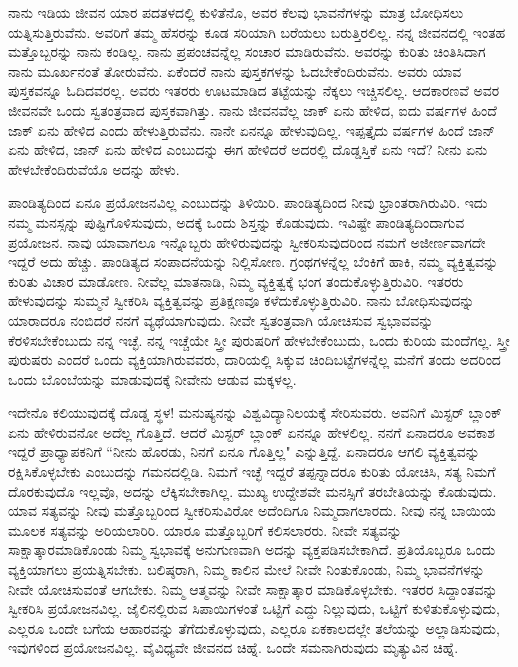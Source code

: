 ನಾನು ಇಡಿಯ ಜೀವನ ಯಾರ ಪದತಳದಲ್ಲಿ ಕುಳಿತೆನೊ, ಅವರ ಕೆಲವು ಭಾವನೆಗಳನ್ನು ಮಾತ್ರ ಬೋಧಿಸಲು ಯತ್ನಿಸುತ್ತಿರುವೆನು. ಅವರಿಗೆ ತಮ್ಮ ಹೆಸರನ್ನು ಕೂಡ ಸರಿಯಾಗಿ ಬರೆಯಲು ಬರುತ್ತಿರಲಿಲ್ಲ. ನನ್ನ ಜೀವನದಲ್ಲಿ ಇಂತಹ ಮತ್ತೊಬ್ಬರನ್ನು ನಾನು ಕಂಡಿಲ್ಲ. ನಾನು ಪ್ರಪಂಚವನ್ನೆಲ್ಲ ಸಂಚಾರ ಮಾಡಿರುವೆನು. ಅವರನ್ನು ಕುರಿತು ಚಿಂತಿಸಿದಾಗ ನಾನು ಮೂರ್ಖನಂತೆ ತೋರುವೆನು. ಏಕೆಂದರೆ ನಾನು ಪುಸ್ತಕಗಳನ್ನು ಓದಬೇಕೆಂದಿರುವೆನು. ಅವರು ಯಾವ ಪುಸ್ತಕವನ್ನೂ ಓದಿದವರಲ್ಲ. ಅವರು ಇತರರು ಊಟಮಾಡಿದ ತಟ್ಟೆಯನ್ನು ನೆಕ್ಕಲು ಇಚ್ಚಿಸಲಿಲ್ಲ. ಆದಕಾರಣವೆ ಅವರ ಜೀವನವೇ ಒಂದು ಸ್ವತಂತ್ರವಾದ ಪುಸ್ತಕವಾಗಿತ್ತು. ನಾನು ಜೀವನವೆಲ್ಲ ಜಾಕ್ ಏನು ಹೇಳಿದ, ಐದು ವರ್ಷಗಳ ಹಿಂದೆ ಜಾಕ್ ಏನು ಹೇಳಿದ ಎಂದು ಹೇಳುತ್ತಿರುವೆನು. ನಾನೇ ಏನನ್ನೂ ಹೇಳುವುದಿಲ್ಲ. ಇಪ್ಪತ್ತೈದು ವರ್ಷಗಳ ಹಿಂದೆ ಜಾನ್ ಏನು ಹೇಳಿದ, ಜಾನ್ ಏನು ಹೇಳಿದ ಎಂಬುದನ್ನು ಈಗ ಹೇಳಿದರೆ ಅದರಲ್ಲಿ ದೊಡ್ಡಸ್ತಿಕೆ ಏನು ಇದೆ? ನೀನು ಏನು ಹೇಳಬೇಕೆಂದಿರುವೆಯೊ ಅದನ್ನು ಹೇಳು.

ಪಾಂಡಿತ್ಯದಿಂದ ಏನೂ ಪ್ರಯೋಜನವಿಲ್ಲ ಎಂಬುದನ್ನು ತಿಳಿಯಿರಿ. ಪಾಂಡಿತ್ಯದಿಂದ ನೀವು ಭ್ರಾಂತರಾಗಿರುವಿರಿ. ಇದು ನಮ್ಮ ಮನಸ್ಸನ್ನು ಪುಷ್ಟಿಗೊಳಿಸುವುದು, ಅದಕ್ಕೆ ಒಂದು ಶಿಸ್ತನ್ನು ಕೊಡುವುದು. ಇವಿಷ್ಟೇ ಪಾಂಡಿತ್ಯದಿಂದಾಗುವ ಪ್ರಯೋಜನ. ನಾವು ಯಾವಾಗಲೂ ಇನ್ನೊಬ್ಬರು ಹೇಳಿರುವುದನ್ನು ಸ್ವೀಕರಿಸುವುದರಿಂದ ನಮಗೆ ಅಜೀರ್ಣವಾಗದೇ ಇದ್ದರೆ ಅದು ಹೆಚ್ಚು. ಪಾಂಡಿತ್ಯದ ಸಂಪಾದನೆಯನ್ನು ನಿಲ್ಲಿಸೋಣ. ಗ್ರಂಥಗಳನ್ನೆಲ್ಲ ಬೆಂಕಿಗೆ ಹಾಕಿ, ನಮ್ಮ ವ್ಯಕ್ತಿತ್ವವನ್ನು ಕುರಿತು ವಿಚಾರ ಮಾಡೋಣ. ನೀವೆಲ್ಲ ಮಾತನಾಡಿ, ನಿಮ್ಮ ವ್ಯಕ್ತಿತ್ವಕ್ಕೆ ಭಂಗ ತಂದುಕೊಳ್ಳುತ್ತಿರುವಿರಿ. ಇತರರು ಹೇಳುವುದನ್ನು ಸುಮ್ಮನೆ ಸ್ವೀಕರಿಸಿ ವ್ಯಕ್ತಿತ್ವವನ್ನು ಪ್ರತಿಕ್ಷಣವೂ ಕಳೆದುಕೊಳ್ಳುತ್ತಿರುವಿರಿ. ನಾನು ಬೋಧಿಸುವುದನ್ನು ಯಾರಾದರೂ ನಂಬಿದರೆ ನನಗೆ ವ್ಯಥೆಯಾಗುವುದು. ನೀವೇ ಸ್ವತಂತ್ರವಾಗಿ ಯೋಚಿಸುವ ಸ್ವಭಾವವನ್ನು ಕೆರಳಿಸಬೇಕೆಂಬುದು ನನ್ನ ಇಚ್ಛೆ. ನನ್ನ ಇಚ್ಚೆಯೇ ಸ್ತ್ರೀ ಪುರುಷರಿಗೆ ಹೇಳಬೇಕೆಂಬುದು, ಒಂದು ಕುರಿಯ ಮಂದೆಗಲ್ಲ. ಸ್ತ್ರೀ ಪುರುಷರು ಎಂದರೆ ಒಂದು ವ್ಯಕ್ತಿಯಾಗಿರುವವರು, ದಾರಿಯಲ್ಲಿ ಸಿಕ್ಕುವ ಚಿಂದಿಬಟ್ಟೆಗಳನ್ನೆಲ್ಲ ಮನೆಗೆ ತಂದು ಅದರಿಂದ ಒಂದು ಬೊಂಬೆಯನ್ನು ಮಾಡುವುದಕ್ಕೆ ನೀವೇನು ಆಡುವ ಮಕ್ಕಳಲ್ಲ.

ಇದೇನೊ ಕಲಿಯುವುದಕ್ಕೆ ದೊಡ್ಡ ಸ್ಥಳ! ಮನುಷ್ಯನನ್ನು ವಿಶ್ವವಿದ್ಯಾನಿಲಯಕ್ಕೆ ಸೇರಿಸುವರು. ಅವನಿಗೆ ಮಿಸ್ಟರ್ ಬ್ಲಾಂಕ್ ಏನು ಹೇಳಿರುವನೋ ಅದೆಲ್ಲ ಗೊತ್ತಿದೆ. ಆದರೆ ಮಿಸ್ಟರ್ ಬ್ಲಾಂಕ್ ಏನನ್ನೂ ಹೇಳಲಿಲ್ಲ. ನನಗೆ ಏನಾದರೂ ಅವಕಾಶ ಇದ್ದರೆ ಪ್ರಾಧ್ಯಾಪಕನಿಗೆ “ನೀನು ಹೊರಡು, ನಿನಗೆ ಏನೂ ಗೊತ್ತಿಲ್ಲ" ಎನ್ನುತ್ತಿದ್ದೆ. ಏನಾದರೂ ಆಗಲಿ ವ್ಯಕ್ತಿತ್ವವನ್ನು ರಕ್ಷಿಸಿಕೊಳ್ಳಬೇಕು ಎಂಬುದನ್ನು ಗಮನದಲ್ಲಿಡಿ. ನಿಮಗೆ ಇಚ್ಛೆ ಇದ್ದರೆ ತಪ್ಪನ್ನಾದರೂ ಕುರಿತು ಯೋಚಿಸಿ, ಸತ್ಯ ನಿಮಗೆ ದೊರಕುವುದೊ ಇಲ್ಲವೊ, ಅದನ್ನು ಲೆಕ್ಕಿಸಬೇಕಾಗಿಲ್ಲ. ಮುಖ್ಯ ಉದ್ದೇಶವೇ ಮನಸ್ಸಿಗೆ ತರಬೇತಿಯನ್ನು ಕೊಡುವುದು. ಯಾವ ಸತ್ಯವನ್ನು ನೀವು ಮತ್ತೊಬ್ಬರಿಂದ ಸ್ವೀಕರಿಸುವಿರೋ ಅದೆಂದಿಗೂ ನಿಮ್ಮದಾಗಲಾರದು. ನೀವು ನನ್ನ ಬಾಯಿಯ ಮೂಲಕ ಸತ್ಯವನ್ನು ಅರಿಯಲಾರಿರಿ. ಯಾರೂ ಮತ್ತೊಬ್ಬರಿಗೆ ಕಲಿಸಲಾರರು. ನೀವೇ ಸತ್ಯವನ್ನು ಸಾಕ್ಷಾತ್ಕಾರಮಾಡಿಕೊಂಡು ನಿಮ್ಮ ಸ್ವಭಾವಕ್ಕೆ ಅನುಗುಣವಾಗಿ ಅದನ್ನು ವ್ಯಕ್ತಪಡಿಸಬೇಕಾಗಿದೆ. ಪ್ರತಿಯೊಬ್ಬರೂ ಒಂದು ವ್ಯಕ್ತಿಯಾಗಲು ಪ್ರಯತ್ನಿಸಬೇಕು. ಬಲಿಷ್ಠರಾಗಿ, ನಿಮ್ಮ ಕಾಲಿನ ಮೇಲೆ ನೀವೇ ನಿಂತುಕೊಂಡು, ನಿಮ್ಮ ಭಾವನೆಗಳನ್ನು ನೀವೇ ಯೋಚಿಸುವಂತೆ ಆಗಬೇಕು. ನಿಮ್ಮ ಆತ್ಮವನ್ನು ನೀವೇ ಸಾಕ್ಷಾತ್ಕಾರ ಮಾಡಿಕೊಳ್ಳಬೇಕು. ಇತರರ ಸಿದ್ದಾಂತವನ್ನು ಸ್ವೀಕರಿಸಿ ಪ್ರಯೋಜನವಿಲ್ಲ. ಜೈಲಿನಲ್ಲಿರುವ ಸಿಪಾಯಿಗಳಂತೆ ಒಟ್ಟಿಗೆ ಎದ್ದು ನಿಲ್ಲುವುದು, ಒಟ್ಟಿಗೆ ಕುಳಿತುಕೊಳ್ಳುವುದು, ಎಲ್ಲರೂ ಒಂದೇ ಬಗೆಯ ಆಹಾರವನ್ನು ತೆಗೆದುಕೊಳ್ಳುವುದು, ಎಲ್ಲರೂ ಏಕಕಾಲದಲ್ಲೇ ತಲೆಯನ್ನು ಅಲ್ಲಾಡಿಸುವುದು, ಇವುಗಳಿಂದ ಪ್ರಯೋಜನವಿಲ್ಲ. ವೈವಿಧ್ಯವೇ ಜೀವನದ ಚಿಹ್ನೆ. ಒಂದೇ ಸಮನಾಗಿರುವುದು ಮೃತ್ಯುವಿನ ಚಿಹ್ನೆ.

